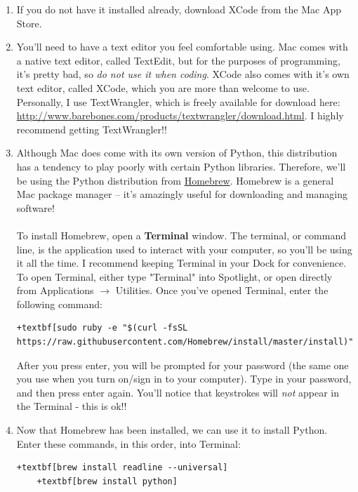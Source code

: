 \documentclass{article}
\begin{document}
\begin{enumerate}
	\item If you do not have it installed already, download XCode from the Mac App Store.
	
	\item You'll need to have a text editor you feel comfortable using. Mac comes with a native text editor, called TextEdit, but for the purposes of programming, it's pretty bad, so \emph{do not use it when coding}. XCode also comes with it's own text editor, called XCode, which you are more than welcome to use. Personally, I use TextWrangler, which is freely available for download here: \\ \href{http://www.barebones.com/products/textwrangler/download.html}{http://www.barebones.com/products/textwrangler/download.html}. I highly recommend getting TextWrangler!!
	
	\item Although Mac does come with its own version of Python, this distribution has a tendency to play poorly with certain Python libraries. Therefore, we'll be using the Python distribution from \href{https://brew.sh}{Homebrew}. Homebrew is a general Mac package manager -- it's amazingly useful for downloading and managing software! 
	\\\\
	To install Homebrew, open a \textbf{Terminal} window. The terminal, or command line, is the application used to interact with your computer, so you'll be using it all the time. I recommend keeping Terminal in your Dock for convenience. To open Terminal, either type "Terminal" into Spotlight, or open directly from Applications $\rightarrow$ Utilities. Once you've opened Terminal, enter the following command:
	\begin{Verbatim}[fontsize=\small,xleftmargin=-2.5cm,commandchars=+\[\]]
		+textbf[sudo ruby -e "$(curl -fsSL https://raw.githubusercontent.com/Homebrew/install/master/install)"]
	\end{Verbatim}
	After you press enter, you will be prompted for your password (the same one you use when you turn on/sign in to your computer). Type in your password, and then press enter again. You'll notice that keystrokes will \emph{not} appear in the Terminal - this is ok!!
	
	\item Now that Homebrew has been installed, we can use it to install Python. Enter these commands, in this order, into Terminal: 
	\begin{Verbatim}[fontsize=\small,xleftmargin=-0.95cm,commandchars=+\[\]]
	+textbf[brew install readline --universal]
	+textbf[brew install python]
	\end{Verbatim}
	

\end{enumerate}
\end{document}

